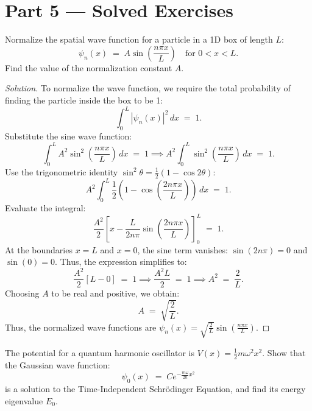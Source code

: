 \documentclass[12pt, a4paper, twoside]{book}
\begin{document}
\newpage

\section{Part 5 --- Solved Exercises}

\begin{exercise}
Normalize the spatial wave function for a particle in a 1D box of length $L$:
\[
  \psi_n(x) \;=\; A \sin\left(\frac{n\pi x}{L}\right) \quad \text{for } 0 < x < L.
\]
Find the value of the normalization constant $A$.
\end{exercise}

\begin{proof}[Solution]
To normalize the wave function, we require the total probability of finding the particle inside the box to be 1:
\[
  \int_0^L |\psi_n(x)|^2 \, dx \;=\; 1.
\]
Substitute the sine wave function:
\[
  \int_0^L A^2 \sin^2\left(\frac{n\pi x}{L}\right) \, dx \;=\; 1 \implies A^2 \int_0^L \sin^2\left(\frac{n\pi x}{L}\right) \, dx \;=\; 1.
\]
Use the trigonometric identity $\sin^2\theta = \frac{1}{2}(1 - \cos 2\theta)$:
\[
  A^2 \int_0^L \frac{1}{2} \left( 1 - \cos\left(\frac{2n\pi x}{L}\right) \right) \, dx \;=\; 1.
\]
Evaluate the integral:
\[
  \frac{A^2}{2} \left[ x - \frac{L}{2n\pi} \sin\left(\frac{2n\pi x}{L}\right) \right]_0^L \;=\; 1.
\]
At the boundaries $x = L$ and $x = 0$, the sine term vanishes: $\sin(2n\pi) = 0$ and $\sin(0) = 0$. Thus, the expression simplifies to:
\[
  \frac{A^2}{2} [ L - 0 ] \;=\; 1 \implies \frac{A^2 L}{2} \;=\; 1 \implies A^2 \;=\; \frac{2}{L}.
\]
Choosing $A$ to be real and positive, we obtain:
\[
  A \;=\; \sqrt{\frac{2}{L}}.
\]
Thus, the normalized wave functions are $\psi_n(x) = \sqrt{\frac{2}{L}} \sin\left(\frac{n\pi x}{L}\right)$.
\end{proof}

\begin{exercise}
The potential for a quantum harmonic oscillator is $V(x) = \frac{1}{2} m \omega^2 x^2$.
Show that the Gaussian wave function:
\[
  \psi_0(x) \;=\; C e^{-\frac{m\omega}{2\hbar} x^2}
\]
is a solution to the Time-Independent Schrödinger Equation, and find its energy eigenvalue $E_0$.
\end{exercise}
\end{document}
